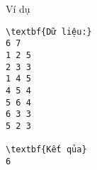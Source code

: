 Ví dụ
\begin{verbatim}
\textbf{Dữ liệu:}
6 7
1 2 5
2 3 3
1 4 5
4 5 4
5 6 4
6 3 3
5 2 3

\textbf{Kết qủa}
6
\end{verbatim}